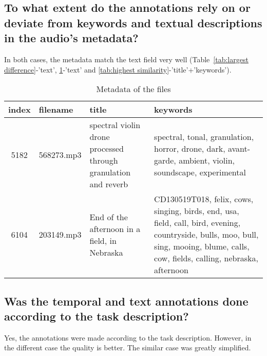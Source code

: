 \subsection{To what extent do the annotations rely on or deviate from keywords and textual descriptions in the audio’s metadata?}
\label{sec:Case Study:b}

In both cases, the metadata match the text field very well (Table~\ref{tab:largest difference}-'text', \ref{tab:metadata match}-'text' and \ref{tab:highest similarity}-'title'+'keywords').

\begin{table}[h]
  \caption{Metadata of the files}
  \label{tab:metadata match}
  \centering
  \begin{tabular}{clp{4cm}p{8.5cm}}
    \toprule
    index & filename & title & keywords \\
    \midrule
    5182 & 568273.mp3 & spectral violin drone processed through granulation and reverb & spectral, tonal, granulation, horror, drone, dark, avant-garde, ambient, violin, soundscape, experimental \\
    6104 & 203149.mp3 & End of the afternoon in a field, in Nebraska & CD130519T018, felix, cows, singing, birds, end, usa, field, call, bird, evening, countryside, bulls, moo, bull, sing, mooing, blume, calls, cow, fields, calling, nebraska, afternoon \\
    \bottomrule
  \end{tabular}
\end{table}

\subsection{Was the temporal and text annotations done according to the task description?}
\label{sec:Case Study:c}

Yes, the annotations were made according to the task description. 
However, in the different case the quality is better. 
The similar case was greatly simplified.



